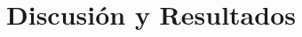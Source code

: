 \documentclass[baaa]{baaa}
\begin{document}



\section{Discusi\'on y Resultados}\label{sec:res}
\end{document}

